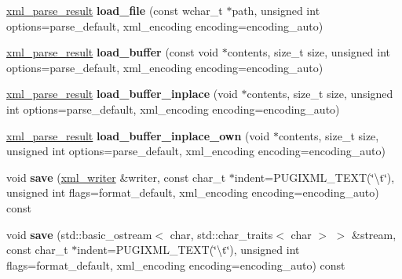 \begin{DoxyCompactItemize}
\item 
\hypertarget{classpugi_1_1xml__document_ac5a29d9c9e754120a5e0c072b332a25a}{\hyperlink{structpugi_1_1xml__parse__result}{xml\-\_\-parse\-\_\-result} {\bfseries load\-\_\-file} (const wchar\-\_\-t $\ast$path, unsigned int options=parse\-\_\-default, xml\-\_\-encoding encoding=encoding\-\_\-auto)}\label{classpugi_1_1xml__document_ac5a29d9c9e754120a5e0c072b332a25a}

\item 
\hypertarget{classpugi_1_1xml__document_ab29840790e26b2166a395c63a2b2d9bd}{\hyperlink{structpugi_1_1xml__parse__result}{xml\-\_\-parse\-\_\-result} {\bfseries load\-\_\-buffer} (const void $\ast$contents, size\-\_\-t size, unsigned int options=parse\-\_\-default, xml\-\_\-encoding encoding=encoding\-\_\-auto)}\label{classpugi_1_1xml__document_ab29840790e26b2166a395c63a2b2d9bd}

\item 
\hypertarget{classpugi_1_1xml__document_a3e20650182ccbdd175ca069dd5e08632}{\hyperlink{structpugi_1_1xml__parse__result}{xml\-\_\-parse\-\_\-result} {\bfseries load\-\_\-buffer\-\_\-inplace} (void $\ast$contents, size\-\_\-t size, unsigned int options=parse\-\_\-default, xml\-\_\-encoding encoding=encoding\-\_\-auto)}\label{classpugi_1_1xml__document_a3e20650182ccbdd175ca069dd5e08632}

\item 
\hypertarget{classpugi_1_1xml__document_a9da4bdcdc4ad914fb0f4680b02983502}{\hyperlink{structpugi_1_1xml__parse__result}{xml\-\_\-parse\-\_\-result} {\bfseries load\-\_\-buffer\-\_\-inplace\-\_\-own} (void $\ast$contents, size\-\_\-t size, unsigned int options=parse\-\_\-default, xml\-\_\-encoding encoding=encoding\-\_\-auto)}\label{classpugi_1_1xml__document_a9da4bdcdc4ad914fb0f4680b02983502}

\item 
\hypertarget{classpugi_1_1xml__document_ae69983f0991300cc9afc8891ff9ca4ac}{void {\bfseries save} (\hyperlink{classpugi_1_1xml__writer}{xml\-\_\-writer} \&writer, const char\-\_\-t $\ast$indent=P\-U\-G\-I\-X\-M\-L\-\_\-\-T\-E\-X\-T(\char`\"{}\textbackslash{}t\char`\"{}), unsigned int flags=format\-\_\-default, xml\-\_\-encoding encoding=encoding\-\_\-auto) const }\label{classpugi_1_1xml__document_ae69983f0991300cc9afc8891ff9ca4ac}

\item 
\hypertarget{classpugi_1_1xml__document_a471d7354af62da143f10943057c99ffa}{void {\bfseries save} (std\-::basic\-\_\-ostream$<$ char, std\-::char\-\_\-traits$<$ char $>$ $>$ \&stream, const char\-\_\-t $\ast$indent=P\-U\-G\-I\-X\-M\-L\-\_\-\-T\-E\-X\-T(\char`\"{}\textbackslash{}t\char`\"{}), unsigned int flags=format\-\_\-default, xml\-\_\-encoding encoding=encoding\-\_\-auto) const }\label{classpugi_1_1xml__document_a471d7354af62da143f10943057c99ffa}


\end{DoxyCompactItemize}
